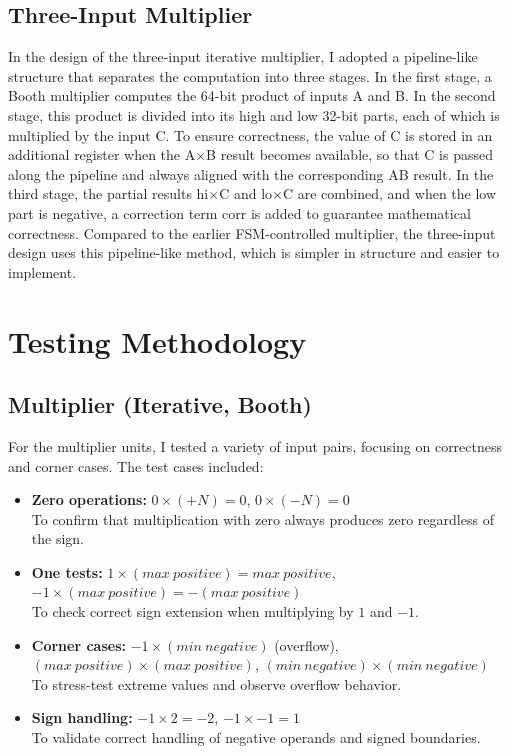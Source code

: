 \documentclass[11pt,a4paper]{article}
\begin{document}
\subsection{Three-Input Multiplier}
In the design of the three-input iterative multiplier, I adopted a pipeline-like structure that separates the computation into three stages. In the first stage, a Booth multiplier computes the 64-bit product of inputs A and B. In the second stage, this product is divided into its high and low 32-bit parts, each of which is multiplied by the input C. To ensure correctness, the value of C is stored in an additional register when the A×B result becomes available, so that C is passed along the pipeline and always aligned with the corresponding AB result. In the third stage, the partial results hi×C and lo×C are combined, and when the low part is negative, a correction term corr is added to guarantee mathematical correctness. Compared to the earlier FSM-controlled multiplier, the three-input design uses this pipeline-like method, which is simpler in structure and easier to implement.

\section{Testing Methodology}
\subsection{Multiplier (Iterative, Booth)}

For the multiplier units, I tested a variety of input pairs, focusing on correctness and corner cases.  
The test cases included:

\begin{itemize}
  \item \textbf{Zero operations:} $0 \times (+N) = 0$, \quad $0 \times (-N) = 0$ \\
        To confirm that multiplication with zero always produces zero regardless of the sign.
  \item \textbf{One tests:} $1 \times (max\ positive) = max\ positive$, \quad $-1 \times (max\ positive) = -(max\ positive)$ \\
        To check correct sign extension when multiplying by $1$ and $-1$.
  \item \textbf{Corner cases:} $-1 \times (min\ negative)$ (overflow), \quad $(max\ positive) \times (max\ positive)$, \quad $(min\ negative) \times (min\ negative)$ \\
        To stress-test extreme values and observe overflow behavior.
  \item \textbf{Sign handling:} $-1 \times 2 = -2$, \quad $-1 \times -1 = 1$ \\
        To validate correct handling of negative operands and signed boundaries.
\end{itemize}
\end{document}
